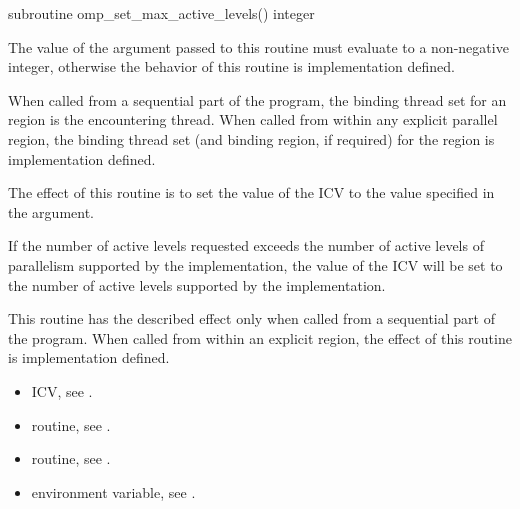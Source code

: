 \begin{fortranspecific}
\begin{ompfSubroutine}
subroutine omp_set_max_active_levels()
integer 
\end{ompfSubroutine}
\end{fortranspecific}

\constraints
The value of the argument passed to this routine must evaluate to a non-negative integer,
otherwise the behavior of this routine is implementation defined.

\binding
When called from a sequential part of the program, the binding thread set for an
 region is the encountering thread. When called
from within any explicit parallel region, the binding thread set (and binding region, if
required) for the  region is implementation defined.

\effect
The effect of this routine is to set the value of the  ICV to the value
specified in the argument.

If the number of active levels requested exceeds the number of
active levels of parallelism
supported by the implementation, the value of the  ICV will be set
to the number of active levels supported by the implementation.

This routine has the described effect only when called from a sequential part of the
program. When called from within an explicit  region, the effect of this
routine is implementation defined.

\crossreferences
\begin{itemize}
\item {} ICV, see
.

\item {} routine, see
.

\item {} routine, see
.

\item {} environment variable, see
.
\end{itemize}










